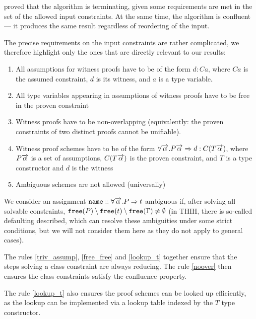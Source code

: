 \citet{vytiniotis2011outsidein} proved that the algorithm is terminating, given some requirements are met in the set of the allowed input constraints. At the same time, the algorithm is confluent --- it produces the same result regardless of reordering of the input.

The precise requirements on the input constraints are rather complicated, we therefore highlight only the ones that are directly relevant to our results:

\begin{enumerate}
    \item All assumptions for witness proofs have to be of the form $d : C a$, where $C a$ is the assumed constraint, $d$ is its witness, and $a$ is a type variable. \label{triv_assump}
    \item All type variables appearing in assumptions of witness proofs have to be free in the proven constraint \label{free_free}
    \item Witness proofs have to be non-overlapping (equivalently: the proven constraints of two distinct proofs cannot be unifiable). \label{noover}
    \item Witness proof schemes have to be of the form $\forall \overrightarrow{\alpha} . P \overrightarrow{\alpha} \Rightarrow d : C (T \overrightarrow{\alpha})$, where $P \overrightarrow{\alpha}$ is a set of assumptions, $C (T \overrightarrow{\alpha})$ is the proven constraint, and $T$ is a type constructor and $d$ is the witness \label{lookup_t}
    \item Ambiguous schemes are not allowed (universally) \label{ambi_rule}
\end{enumerate}

\begin{remark}
    We consider an assignment $\mathtt{name} :: \forall \overrightarrow{\alpha} . P  \Rightarrow t$ ambiguous if, after solving all solvable constraints, $\mathtt{free} (P) \setminus \mathtt{free} (t) \setminus \mathtt{free} (\Gamma) \neq \emptyset$ (in THIH, there is so-called defaulting described, which can resolve these ambiguities under some strict conditions, but we will not consider them here as they do not apply to general cases).
\end{remark}

The rules \ref{triv_assump}, \ref{free_free} and \ref{lookup_t} together ensure that the steps solving a class constraint are always reducing. The rule \ref{noover} then ensures the class constraints satisfy the confluence property.

The rule \ref{lookup_t} also ensures the proof schemes can be looked up efficiently, as the lookup can be implemented via a lookup table indexed by the $T$ type constructor.

